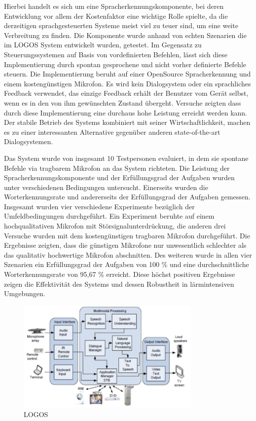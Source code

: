 Hierbei handelt es sich um eine Spracherkennungskomponente, bei deren Entwicklung vor allem der Kostenfaktor eine wichtige Rolle spielte, da die derzeitigen sprachgesteuerten Systeme meist viel zu teuer sind, um eine weite Verbreitung zu finden. Die Komponente wurde anhand von echten Szenarien die im LOGOS System entwickelt wurden, getestet. Im Gegensatz zu Steuerungssystemen auf Basis von vordefinierten Befehlen, lässt sich diese Implementierung durch spontan gesprochene und nicht vorher definierte Befehle steuern. Die Implementierung beruht auf einer OpenSource Spracherkennung und einem kostengünstigen Mikrofon. Es wird kein Dialogsystem oder ein sprachliches Feedback verwendet, das einzige Feedback erhält der Benutzer vom Gerät selbst, wenn es in den von ihm gewünschten Zustand übergeht. Versuche zeigten dass durch diese Implementierung eine durchaus hohe Leistung erreicht werden kann. Der stabile Betrieb des Systems kombiniert mit seiner Wirtschaftlichkeit, machen es zu einer interessanten Alternative gegenüber anderen state-of-the-art Dialogsystemen.

Das System wurde von insgesamt 10 Testpersonen evaluiert, in dem sie spontane Befehle via tragbarem Mikrofon an das System richteten. Die Leistung der Spracherkennungskomponente und der Erfüllungsgrad der Aufgaben wurden unter verschiedenen Bedingungen untersucht. Einerseits wurden die Worterkennungsrate und andererseits der Erfüllungsgrad der Aufgaben gemessen. Insgesamt wurden vier verschiedene Experimente bezüglich der Umfeldbedingungen durchgeführt. Ein Experiment beruhte auf einem hochqualitativen Mikrofon mit Störsignalunterdrückung, die anderen drei Versuche wurden mit dem kostengünstigen tragbaren Mikrofon durchgeführt. Die Ergebnisse zeigten, dass die günstigen Mikrofone nur unwesentlich schlechter als das qualitativ hochwertige Mikrofon abschnitten. Des weiteren wurde in allen vier Szenarien ein Erfüllungsgrad der Aufgaben von 100 \% und eine durchschnittliche Worterkennungsrate von 95,67 \% erreicht. Diese höchst positiven Ergebnisse zeigen die Effektivität des Systems und dessen Robustheit in lärmintensiven Umgebungen.

\begin{figure}[h!]
	\centering
	\includegraphics[width=0.8\textwidth]{img/Feedback-Mechanismen/LOGOS.png}
	\caption{LOGOS}
	\label{fig:feedbackLOGOS}
\end{figure}

